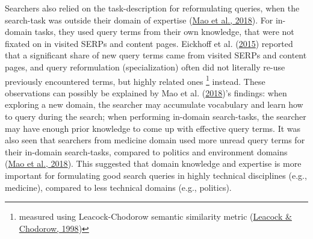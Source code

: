 \documentclass[letterpaper, nobind]{templates/ociamthesis}
\begin{document}
Searchers also relied on the task-description for reformulating queries,
when the search-task was outside their domain of expertise (\protect\hyperlink{ref-133}{Mao et al., 2018}). For
in-domain tasks, they used query terms from their own knowledge, that
were not fixated on in visited SERPs and content pages. Eickhoff et al. (\protect\hyperlink{ref-127}{2015}) reported
that a significant share of new query terms came from visited SERPs and
content pages, and query reformulation (specialization) often did not
literally re-use previously encountered terms, but highly related
ones \footnote{
  measured using Leacock-Chodorow semantic similarity metric (\protect\hyperlink{ref-leacock1998combining}{Leacock \& Chodorow, 1998})} instead. These observations can possibly be explained by Mao et al. (\protect\hyperlink{ref-133}{2018})'s
findings: when exploring a new domain, the searcher may accumulate
vocabulary and learn how to query during the search; when performing
in-domain search-tasks, the searcher may have enough prior knowledge to
come up with effective query terms. It was also seen that searchers from
medicine domain used more unread query terms for their in-domain
search-tasks, compared to politics and environment domains (\protect\hyperlink{ref-133}{Mao et al., 2018}). This
suggested that domain knowledge and expertise is more important for
formulating good search queries in highly technical disciplines (e.g.,
medicine), compared to less technical domains (e.g., politics).
\end{document}

